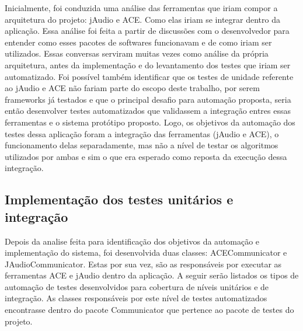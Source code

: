 Inicialmente, foi conduzida uma análise das ferramentas que iriam compor a arquitetura do projeto: jAudio e ACE. Como elas iriam se integrar dentro da aplicação. Essa análise foi feita a partir de discussões com o desenvolvedor para entender como esses pacotes de softwares funcionavam e de como iriam ser utilizados. Essas conversas serviram muitas vezes como análise da própria arquitetura, antes da implementação e do levantamento dos testes que iriam ser automatizado. Foi possível também identificar que os testes de unidade referente ao jAudio e ACE não fariam parte do escopo deste trabalho, por serem frameworks já testados e que o principal desafio para automação proposta, seria então desenvolver testes automatizados que validassem a integração entres essas ferramentas e o sistema protótipo proposto. Logo, os objetivos da automação dos testes dessa aplicação foram a integração das ferramentas (jAudio e ACE), o funcionamento delas separadamente, mas não a nível de testar os algoritmos utilizados por ambas e sim o que era esperado como reposta da execução dessa integração.

\subsection{Implementação dos testes unitários e integração}

Depois da analise feita para identificação dos objetivos da automação e implementação do sistema, foi desenvolvida duas classes: ACECommunicator e JAudioCommunicator. Estas por sua vez, são as responsáveis por executar as ferramentas ACE e jAudio dentro da aplicação. A seguir serão listados os tipos de automação de testes desenvolvidos para cobertura de níveis unitários e de integração. As classes responsáveis por este nível de testes automatizados encontrasse dentro do pacote Communicator que pertence ao pacote de testes do projeto.  


